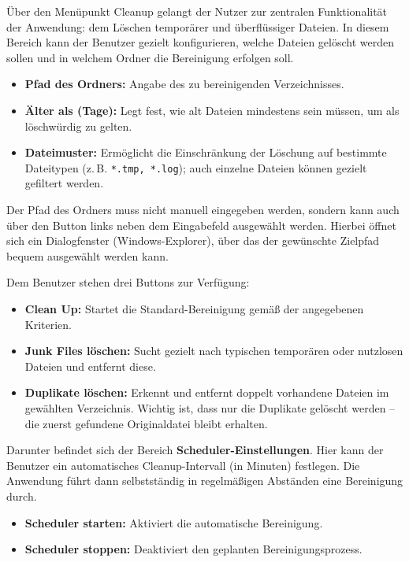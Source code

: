 

Über den Menüpunkt \glqq Cleanup\grqq{} gelangt der Nutzer zur zentralen Funktionalität der Anwendung: dem Löschen temporärer und überflüssiger Dateien. In diesem Bereich kann der Benutzer gezielt konfigurieren, welche Dateien gelöscht werden sollen und in welchem Ordner die Bereinigung erfolgen soll.

\begin{itemize}
    \item \textbf{Pfad des Ordners:} Angabe des zu bereinigenden Verzeichnisses.
    \item \textbf{Älter als (Tage):} Legt fest, wie alt Dateien mindestens sein müssen, um als löschwürdig zu gelten.
    \item \textbf{Dateimuster:} Ermöglicht die Einschränkung der Löschung auf bestimmte Dateitypen (z.\,B. \texttt{*.tmp, *.log}); auch einzelne Dateien können gezielt gefiltert werden.
\end{itemize}

Der Pfad des Ordners muss nicht manuell eingegeben werden, sondern kann auch über den Button links neben dem Eingabefeld ausgewählt werden. Hierbei öffnet sich ein Dialogfenster (Windows-Explorer), über das der gewünschte Zielpfad bequem ausgewählt werden kann.

\vspace{1em}
Dem Benutzer stehen drei Buttons zur Verfügung:

\begin{itemize}
    \item \textbf{Clean Up:} Startet die Standard-Bereinigung gemäß der angegebenen Kriterien.
    \item \textbf{Junk Files löschen:} Sucht gezielt nach typischen temporären oder nutzlosen Dateien und entfernt diese.
    \item \textbf{Duplikate löschen:} Erkennt und entfernt doppelt vorhandene Dateien im gewählten Verzeichnis. Wichtig ist, dass nur die Duplikate gelöscht werden – die zuerst gefundene Originaldatei bleibt erhalten.
\end{itemize}

\vspace{1em}
Darunter befindet sich der Bereich \textbf{Scheduler-Einstellungen}. Hier kann der Benutzer ein automatisches Cleanup-Intervall (in Minuten) festlegen. Die Anwendung führt dann selbstständig in regelmäßigen Abständen eine Bereinigung durch.

\begin{itemize}
    \item \textbf{Scheduler starten:} Aktiviert die automatische Bereinigung.
    \item \textbf{Scheduler stoppen:} Deaktiviert den geplanten Bereinigungsprozess.
\end{itemize}

